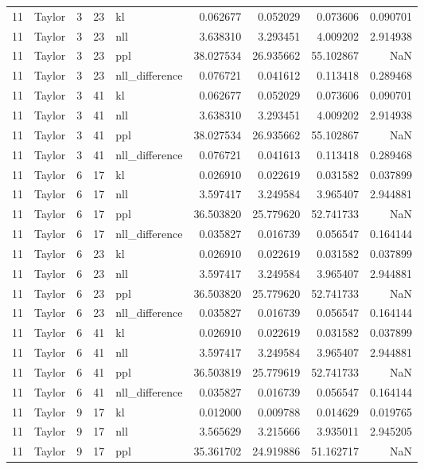 \begin{tabular}{rlrrlrrrr}
11 & Taylor & 3 & 23 & kl & 0.062677 & 0.052029 & 0.073606 & 0.090701 \\
11 & Taylor & 3 & 23 & nll & 3.638310 & 3.293451 & 4.009202 & 2.914938 \\
11 & Taylor & 3 & 23 & ppl & 38.027534 & 26.935662 & 55.102867 & NaN \\
11 & Taylor & 3 & 23 & nll_difference & 0.076721 & 0.041612 & 0.113418 & 0.289468 \\
11 & Taylor & 3 & 41 & kl & 0.062677 & 0.052029 & 0.073606 & 0.090701 \\
11 & Taylor & 3 & 41 & nll & 3.638310 & 3.293451 & 4.009202 & 2.914938 \\
11 & Taylor & 3 & 41 & ppl & 38.027534 & 26.935662 & 55.102867 & NaN \\
11 & Taylor & 3 & 41 & nll_difference & 0.076721 & 0.041613 & 0.113418 & 0.289468 \\
11 & Taylor & 6 & 17 & kl & 0.026910 & 0.022619 & 0.031582 & 0.037899 \\
11 & Taylor & 6 & 17 & nll & 3.597417 & 3.249584 & 3.965407 & 2.944881 \\
11 & Taylor & 6 & 17 & ppl & 36.503820 & 25.779620 & 52.741733 & NaN \\
11 & Taylor & 6 & 17 & nll_difference & 0.035827 & 0.016739 & 0.056547 & 0.164144 \\
11 & Taylor & 6 & 23 & kl & 0.026910 & 0.022619 & 0.031582 & 0.037899 \\
11 & Taylor & 6 & 23 & nll & 3.597417 & 3.249584 & 3.965407 & 2.944881 \\
11 & Taylor & 6 & 23 & ppl & 36.503820 & 25.779620 & 52.741733 & NaN \\
11 & Taylor & 6 & 23 & nll_difference & 0.035827 & 0.016739 & 0.056547 & 0.164144 \\
11 & Taylor & 6 & 41 & kl & 0.026910 & 0.022619 & 0.031582 & 0.037899 \\
11 & Taylor & 6 & 41 & nll & 3.597417 & 3.249584 & 3.965407 & 2.944881 \\
11 & Taylor & 6 & 41 & ppl & 36.503819 & 25.779619 & 52.741733 & NaN \\
11 & Taylor & 6 & 41 & nll_difference & 0.035827 & 0.016739 & 0.056547 & 0.164144 \\
11 & Taylor & 9 & 17 & kl & 0.012000 & 0.009788 & 0.014629 & 0.019765 \\
11 & Taylor & 9 & 17 & nll & 3.565629 & 3.215666 & 3.935011 & 2.945205 \\
11 & Taylor & 9 & 17 & ppl & 35.361702 & 24.919886 & 51.162717 & NaN \\

\end{tabular}
